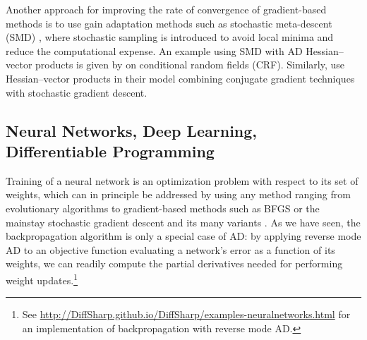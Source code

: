 \documentclass[twoside,11pt]{article}
\begin{document}
Another approach for improving the rate of convergence of gradient-based methods is to use gain adaptation methods such as stochastic meta-descent (SMD) \citep{Schraudolph1999}, where stochastic sampling is introduced to avoid local minima and reduce the computational expense. An example using SMD with AD Hessian--vector products is given by \citet{Vishwanathan2006} on conditional random fields (CRF). Similarly, \citet{Schraudolph2003} use Hessian--vector products in their model combining conjugate gradient techniques with stochastic gradient descent.

\subsection{Neural Networks, Deep Learning, Differentiable Programming}

Training of a neural network is an optimization problem with respect to its set of weights, which can in principle be addressed by using any method ranging from evolutionary algorithms \citep{such2017deep} to gradient-based methods such as BFGS \citep{Apostolopoulou2009} or the mainstay stochastic gradient descent \citep{bottou2010large} and its many variants \citep{kingma2015adam,tieleman2012lecture,duchi2011adaptive}. As we have seen, the backpropagation algorithm is only a special case of AD: by applying reverse mode AD to an objective function evaluating a network's error as a function of its weights, we can readily compute the partial derivatives needed for performing weight updates.\footnote{See \url{http://DiffSharp.github.io/DiffSharp/examples-neuralnetworks.html} for an implementation of backpropagation with reverse mode AD.}
\end{document}
